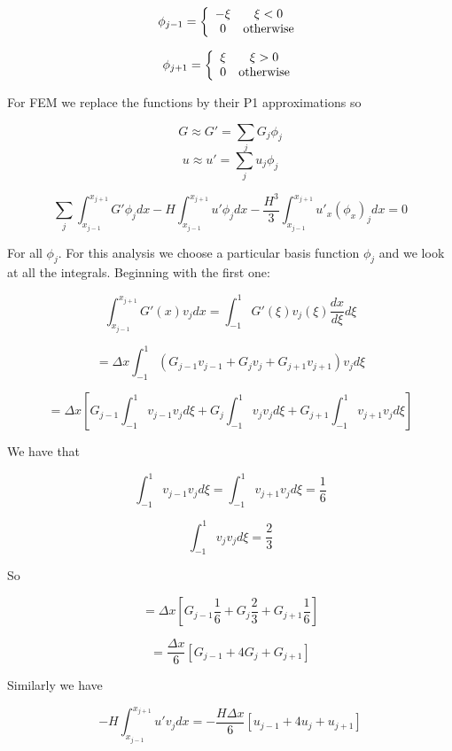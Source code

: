 \documentclass[12pt]{article}
\begin{document}
\begin{equation}
\phi_{j-1} = \left\lbrace \begin{array}{c c}
-\xi & \xi < 0 \\
0 & \text{otherwise}
\end{array} 
\right.
\end{equation}

\begin{equation}
\phi_{j+1} = \left\lbrace \begin{array}{c c}
\xi & \xi > 0 \\
0 & \text{otherwise}
\end{array} 
\right.
\end{equation}

For FEM we replace the functions by their P1 approximations so

\[G \approx G' = \sum_{j}G_{j}\phi_{j}\]
\[u \approx u' = \sum_{j}u_{j}\phi_{j}\]

\[\sum_{j}\int_{x_{j-1}}^{x_{j+1}} G'\phi_{j} dx - H\int_{x_{j-1}}^{x_{j+1}} u'\phi_{j} dx -  \frac{H^3}{3}\int_{x_{j-1}}^{x_{j+1}}u'_{x}(\phi_{x})_{j}dx = 0 \]

For all $\phi_j$. For this analysis we choose a particular basis function $\phi_j$ and we look at all the integrals. Beginning with the first one:

\[\int_{x_{j-1}}^{x_{j+1}} G'(x)v_{j} dx = \int_{-1}^{1} G'(\xi)v_{j}(\xi) \frac{d x}{d\xi}d\xi\]

\[= \Delta x \int_{-1}^{1} \left(G_{j- 1}v_{j - 1} + G_{j}v_{j} +G_{j+ 1}v_{j+ 1} \right)v_{j} d\xi\]

\[= \Delta x \left[G_{j- 1} \int_{-1}^{1} v_{j - 1}v_{j} d\xi + G_{j} \int_{-1}^{1} v_{j}v_{j} d\xi +  G_{j+1} \int_{-1}^{1} v_{j + 1}v_{j} d\xi\right]\]

We have that

\[\int_{-1}^{1} v_{j - 1}v_{j} d\xi =  \int_{-1}^{1} v_{j + 1}v_{j} d\xi = \frac{1}{6}\]

\[\int_{-1}^{1} v_{j}v_{j} d\xi = \frac{2}{3}\]

So

\[= \Delta x \left[G_{j- 1} \frac{1}{6} + G_{j} \frac{2}{3} +  G_{j+1} \frac{1}{6}\right]\]

\[=  \frac{\Delta x}{6} \left[G_{j- 1} + 4G_{j} +  G_{j+1} \right]\]

Similarly we have

\[- H\int_{x_{j-1}}^{x_{j+1}} u'v_{j} dx = -\frac{H\Delta x}{6} \left[u_{j- 1} + 4u_{j} +  u_{j+1} \right] \]
\end{document}
